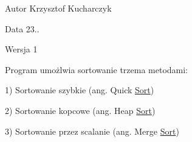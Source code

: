 \begin{DoxyAuthor}{\-Autor}
\-Krzysztof \-Kucharczyk 
\end{DoxyAuthor}
\begin{DoxyDate}{\-Data}
23.. 
\end{DoxyDate}
\begin{DoxyVersion}{\-Wersja}
1
\end{DoxyVersion}
\-Program umożlwia sortowanie trzema metodami\-:\par
 1) \-Sortowanie szybkie (ang. \-Quick \hyperlink{class_sort}{\-Sort}) \par
 2) \-Sortowanie kopcowe (ang. \-Heap \hyperlink{class_sort}{\-Sort}) \par
 3) \-Sortowanie przez scalanie (ang. \-Merge \hyperlink{class_sort}{\-Sort}) \par
 